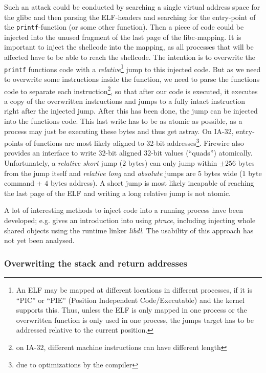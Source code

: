 Such an attack could be conducted by searching a single virtual address space
for the glibc and then parsing the ELF-headers and searching for the entry-point
of the \texttt{printf}-function (or some other function).  Then a piece of code
could be injected into the unused fragment of the last page of the libc-mapping.
It is important to inject the shellcode into the mapping, as all processes that
will be affected have to be able to reach the shellcode.  The intention is to
overwrite the \texttt{printf} functions code with a \emph{relative}\footnote{An
ELF may be mapped at different locations in different processes, if it is
``PIC'' or ``PIE'' (Position Independent Code/Executable) and the kernel
supports this.  Thus, unless the ELF is only mapped in one process or the
overwritten function is only used in one process, the jumps target has to be
addressed relative to the current position.} jump to this injected code.  But as
we need to overwrite some instructions inside the function, we need to parse the
functions code to separate each instruction\footnote{on IA-32, different machine
instructions can have different length}, so that after our code is executed, it
executes a copy of the overwritten instructions and jumps to a fully intact
instruction right after the injected jump. After this has been done, the jump
can be injected into the functions code. This last write has to be as atomic as
possible, as a process may just be executing these bytes and thus get astray.
On IA-32, entry-points of functions are most likely aligned to 32-bit
addresses\footnote{due to optimizations by the compiler}.  Firewire also
provides an interface to write 32-bit aligned 32-bit values (``quads'')
atomically.  Unfortunately, a \emph{relative short} jump ($2$ bytes) can only
jump within $\pm256$ bytes from the jump itself and \emph{relative long} and
\emph{absolute} jumps are $5$ bytes wide ($1$ byte command + $4$ bytes address).
A short jump is most likely incapable of reaching the last page of the ELF and
writing a long relative jump is not atomic.

A lot of interesting methods to inject code into a running process have been
developed; e.g\@. \cite{phrack59.8:2002} gives an introduction into using
\emph{ptrace}, including injecting whole shared objects using the runtime linker
\emph{libdl}.  The usability of this approach has not yet been analysed.


\subsubsection{Overwriting the stack and return addresses}

